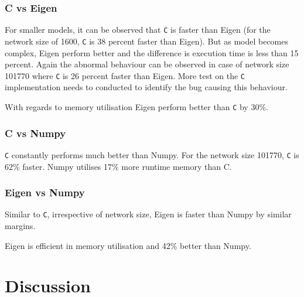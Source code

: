 \subsection{C vs Eigen}
For smaller models, it can be observed that \texttt{C} is faster than Eigen (for the network size of 1600, \texttt{C} is 38 percent faster than Eigen). But as model becomes complex, Eigen perform better and the difference is execution time is less than 15 percent. Again the abnormal behaviour can be observed in case of network size 101770 where \texttt{C} is 26 percent faster than Eigen. More test on the \texttt{C} implementation needs to conducted to identify the bug causing this behaviour.

With regards to memory utilisation Eigen perform better than \texttt{C} by 30\%.

\subsection{C vs Numpy}
\texttt{C} constantly performs much better than Numpy. For the network size 101770, \texttt{C} is 62\% faster.
Numpy utilises 17\% more runtime memory than C.

\subsection{Eigen vs Numpy}
Similar to \texttt{C}, irrespective of network size, Eigen is faster than Numpy by similar margins.

Eigen is efficient in memory utilisation and 42\% better than Numpy.




\chapter{Discussion}

